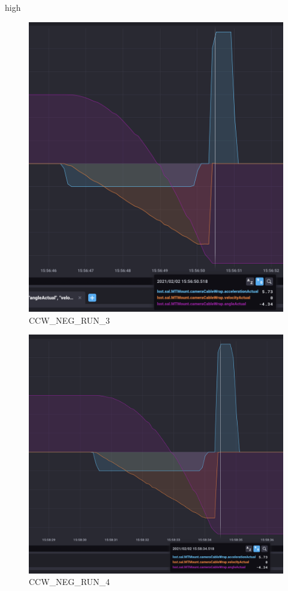 high\documentclass[SE,lsstdraft,authoryear,toc]{lsstdoc}
\begin{document}
\begin{figure}[h!]
  \includegraphics[width=\linewidth]{media/CCW_design_speed_neg_test3.png}
  \caption{CCW\_NEG\_RUN\_3}
  \label{fig:CCW_NEG_RUN_3}
\end{figure}
\begin{figure}[h!]
  \includegraphics[width=\linewidth]{media/CCW_design_speed_neg_test4.png}
  \caption{CCW\_NEG\_RUN\_4}
  \label{fig:CCW_NEG_RUN_4}
\end{figure}
\end{document}
